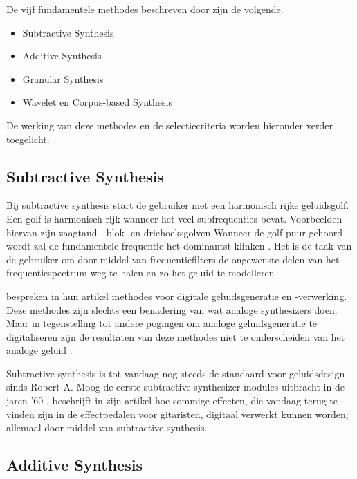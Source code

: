 De vijf fundamentele methodes beschreven door \textcite{methodes} zijn de volgende.

\begin{itemize}
    \item Subtractive Synthesis
    \item Additive Synthesis
    \item Granular Synthesis
    \item Wavelet en Corpus-based Synthesis
\end{itemize}{}

De werking van deze methodes en de selectiecriteria worden hieronder verder toegelicht.

\subsection{Subtractive Synthesis}
\label{methode:subtractive}

Bij subtractive synthesis start de gebruiker met een harmonisch rijke geluidsgolf. Een golf is harmonisch rijk wanneer het veel subfrequenties bevat. Voorbeelden hiervan zijn zaagtand-, blok- en driehoeksgolven Wanneer de golf puur gehoord wordt zal de fundamentele frequentie het dominantst klinken \autocite{harmonics}. Het is de taak van de gebruiker om door middel van frequentiefilters de ongewenste delen van het frequentiespectrum weg te halen en zo het geluid te modelleren \autocite{subtractive}

\textcite{subtractive} bespreken in hun artikel methodes voor digitale geluidsgeneratie en -verwerking. Deze methodes zijn slechts een benadering van wat analoge synthesizers doen. Maar in tegenstelling tot andere pogingen om analoge geluidsgeneratie te digitaliseren zijn de resultaten van deze methodes niet te onderscheiden van het analoge geluid \autocite{subtractive}.

Subtractive synthesis is tot vandaag nog steeds de standaard voor geluidsdesign sinds Robert A. Moog de eerste subtractive synthesizer modules uitbracht in de jaren '60 \autocite{subtractive}. \textcite{guitarpedals} beschrijft in zijn artikel hoe sommige effecten, die vandaag terug te vinden zijn in de effectpedalen voor gitaristen, digitaal verwerkt kunnen worden; allemaal door middel van subtractive synthesis.

\subsection{Additive Synthesis}


